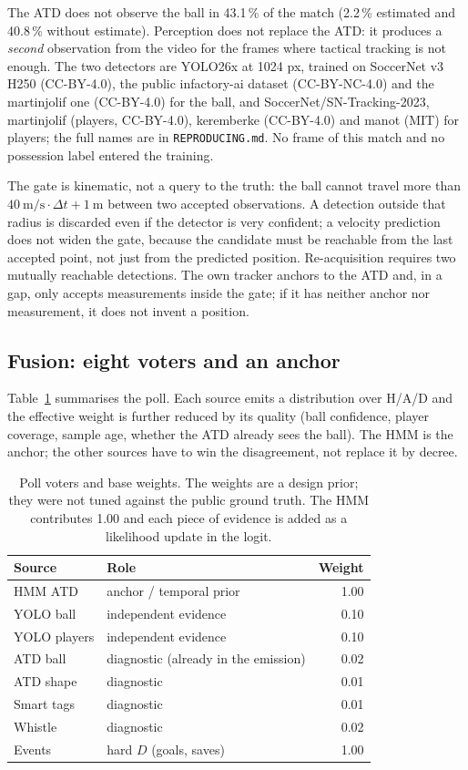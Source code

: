 \documentclass[10pt,a4paper]{article}
\begin{document}
The ATD does not observe the ball in 43.1\,\% of the match (2.2\,\% estimated and 40.8\,\%
without estimate). Perception does not replace the ATD: it produces a \emph{second}
observation from the video for the frames where tactical tracking is not enough. The two
detectors are YOLO26x at 1024 px, trained on SoccerNet v3 H250 (CC-BY-4.0), the public
infactory-ai dataset (CC-BY-NC-4.0) and the martinjolif one (CC-BY-4.0) for the ball, and
SoccerNet/SN-Tracking-2023, martinjolif (players, CC-BY-4.0), keremberke (CC-BY-4.0) and manot
(MIT) for players; the full names are in \texttt{REPRODUCING.md}. No frame of this match and
no possession label entered the training.

The gate is kinematic, not a query to the truth: the ball cannot travel more than
$40\ \mathrm{m/s}\cdot\Delta t + 1\ \mathrm{m}$ between two accepted observations. A
detection outside that radius is discarded even if the detector is very confident; a
velocity prediction does not widen the gate, because the candidate must be reachable from
the last accepted point, not just from the predicted position. Re-acquisition requires two
mutually reachable detections. The own tracker anchors to the ATD and, in a gap, only
accepts measurements inside the gate; if it has neither anchor nor measurement, it does not
invent a position.

\subsection{Fusion: eight voters and an anchor}

Table~\ref{tab:weights} summarises the poll. Each source emits a distribution over H/A/D and
the effective weight is further reduced by its quality (ball confidence, player coverage,
sample age, whether the ATD already sees the ball). The HMM is the anchor; the other sources
have to win the disagreement, not replace it by decree.

\begin{table}[t]
\centering
\small
\caption{Poll voters and base weights. The weights are a design prior; they were not tuned
against the public ground truth. The HMM contributes 1.00 and each piece of evidence is added
as a likelihood update in the logit.}
\label{tab:weights}
\begin{tabular}{llr}
\toprule
Source & Role & Weight \\
\midrule
HMM ATD & anchor / temporal prior & 1.00 \\
YOLO ball & independent evidence & 0.10 \\
YOLO players & independent evidence & 0.10 \\
ATD ball & diagnostic (already in the emission) & 0.02 \\
ATD shape & diagnostic & 0.01 \\
Smart tags & diagnostic & 0.01 \\
Whistle & diagnostic & 0.02 \\
Events & hard $D$ (goals, saves) & 1.00 \\
\bottomrule
\end{tabular}
\end{table}
\end{document}
